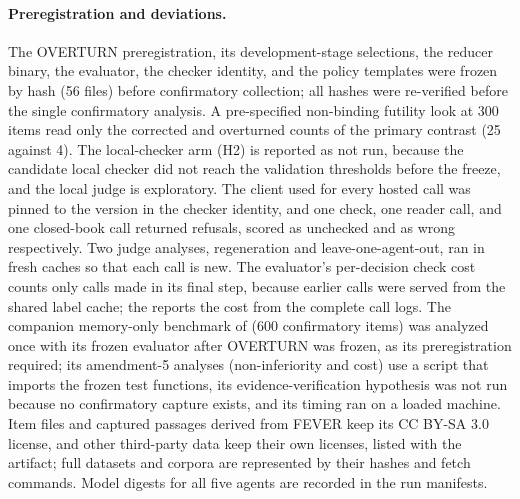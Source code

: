 \paragraph{Preregistration and deviations.} The OVERTURN preregistration, its development-stage selections, the reducer binary, the evaluator, the checker identity, and the policy templates were frozen by hash (56 files) before confirmatory collection; all hashes were re-verified before the single confirmatory analysis. A pre-specified non-binding futility look at 300 items read only the corrected and overturned counts of the primary contrast (25 against 4). The local-checker arm (H2) is reported as not run, because the candidate local checker did not reach the validation thresholds before the freeze, and the local judge is exploratory. The client used for every hosted call was pinned to the version in the checker identity, and one check, one reader call, and one closed-book call returned refusals, scored as unchecked and as wrong respectively. Two judge analyses, regeneration and leave-one-agent-out, ran in fresh caches so that each call is new. The evaluator's per-decision check cost counts only calls made in its final step, because earlier calls were served from the shared label cache; the  reports the cost from the complete call logs. The companion memory-only benchmark of  (600 confirmatory items) was analyzed once with its frozen evaluator after OVERTURN was frozen, as its preregistration required; its amendment-5 analyses (non-inferiority and cost) use a script that imports the frozen test functions, its evidence-verification hypothesis was not run because no confirmatory capture exists, and its timing ran on a loaded machine. Item files and captured passages derived from FEVER keep its CC BY-SA 3.0 license, and other third-party data keep their own licenses, listed with the artifact; full datasets and corpora are represented by their hashes and fetch commands. Model digests for all five agents are recorded in the run manifests.


